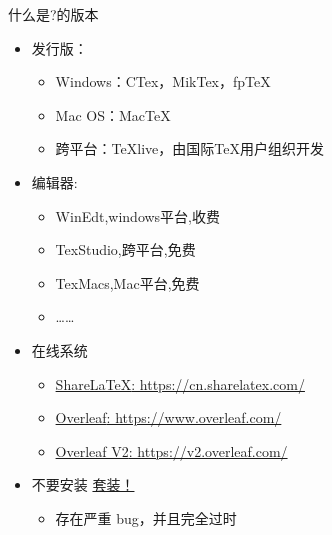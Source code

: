 \documentclass[xcolor=svgnames, t, aspectratio=169]{ctexbeamer}
\begin{document}
\begin{frame}[t]{什么是\latex?}{\latex 的版本}
  \stretchon
  \begin{itemize}
  \item 发行版：
    \begin{itemize}    
    \item Windows：CTex，MikTex，fpTeX
    \item Mac OS：MacTeX        
    \item 跨平台：\alert{TeXlive}，由国际{\TeX}用户组织开发
    \end{itemize}
  \item 编辑器:
    \begin{itemize}
    \item WinEdt,windows平台,收费
    \item \alert{TexStudio},跨平台,免费
    \item TexMacs,Mac平台,免费
    \item \ldots\ldots
    \end{itemize}
  \item 在线系统
    \begin{itemize}
    \item
      \href{https://cn.sharelatex.com/}{\alert{ShareLaTeX}: 
        https://cn.sharelatex.com/}%
    \item
      \href{https://www.overleaf.com/}{\alert{Overleaf}: 
        https://www.overleaf.com/}
    \item
      \href{https://v2.overleaf.com/}{\alert{Overleaf V2}: 
        https://v2.overleaf.com/}  
    \end{itemize}
  \item \alert{不要安装 \href{http://www.ctex.org/HomePage}{\CTeX{} 套装！}}
    \begin{itemize}
      \item \alert{存在严重 bug，并且完全过时}
    \end{itemize}
  \end{itemize}
  \stretchoff
\end{frame}
\end{document}
